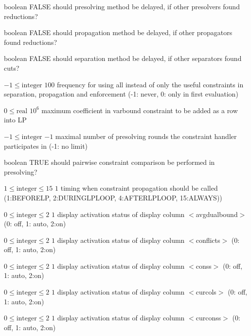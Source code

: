%
{boolean}%
{FALSE}%
{should presolving method be delayed, if other presolvers found reductions?}%
{}

%
{boolean}%
{FALSE}%
{should propagation method be delayed, if other propagators found reductions?}%
{}

%
{boolean}%
{FALSE}%
{should separation method be delayed, if other separators found cuts?}%
{}

%
{$-1\leq\textrm{integer}$}%
{$100$}%
{frequency for using all instead of only the useful constraints in separation, propagation and enforcement (-1: never, 0: only in first evaluation)}%
{}

%
{$0\leq\textrm{real}$}%
{$10^{  6}$}%
{maximum coefficient in varbound constraint to be added as a row into LP}%
{}

%
{$-1\leq\textrm{integer}$}%
{$-1$}%
{maximal number of presolving rounds the constraint handler participates in (-1: no limit)}%
{}

%
{boolean}%
{TRUE}%
{should pairwise constraint comparison be performed in presolving?}%
{}

%
{$1\leq\textrm{integer}\leq15$}%
{$1$}%
{timing when constraint propagation should be called (1:BEFORELP, 2:DURINGLPLOOP, 4:AFTERLPLOOP, 15:ALWAYS))}%
{}

%
{$0\leq\textrm{integer}\leq2$}%
{$1$}%
{display activation status of display column $<$avgdualbound$>$ (0: off, 1: auto, 2:on)}%
{}

%
{$0\leq\textrm{integer}\leq2$}%
{$1$}%
{display activation status of display column $<$conflicts$>$ (0: off, 1: auto, 2:on)}%
{}

%
{$0\leq\textrm{integer}\leq2$}%
{$1$}%
{display activation status of display column $<$conss$>$ (0: off, 1: auto, 2:on)}%
{}

%
{$0\leq\textrm{integer}\leq2$}%
{$1$}%
{display activation status of display column $<$curcols$>$ (0: off, 1: auto, 2:on)}%
{}

%
{$0\leq\textrm{integer}\leq2$}%
{$1$}%
{display activation status of display column $<$curconss$>$ (0: off, 1: auto, 2:on)}%
{}

